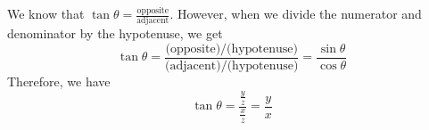 \documentclass[11pt, letterpaper, twoside, tikz]{article}
\begin{document}
\begin{enumerate}
We know that $\tan \theta = \frac{\text{opposite}}{\text{adjacent}}$. However, when we divide the numerator and denominator by the hypotenuse, we get
$$\tan \theta=\frac{\text{(opposite)/(hypotenuse)}}{\text{(adjacent)/(hypotenuse)}}=\frac{\sin \theta}{\cos \theta}$$
Therefore, we have
$$\tan\theta=\frac{\frac{y}{z}}{\frac{x}{z}}=\frac{y}{x}$$

\end{enumerate}
\end{document}
